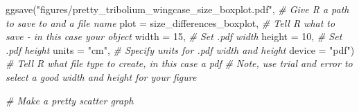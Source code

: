 \documentclass[
]{book}
\newenvironment{Shaded}{\begin{snugshade}}{\end{snugshade}}
\newcommand{\AttributeTok}[1]{\textcolor[rgb]{0.77,0.63,0.00}{#1}}
\newcommand{\CommentTok}[1]{\textcolor[rgb]{0.56,0.35,0.01}{\textit{#1}}}
\newcommand{\DecValTok}[1]{\textcolor[rgb]{0.00,0.00,0.81}{#1}}
\newcommand{\FunctionTok}[1]{\textcolor[rgb]{0.00,0.00,0.00}{#1}}
\newcommand{\NormalTok}[1]{#1}
\newcommand{\StringTok}[1]{\textcolor[rgb]{0.31,0.60,0.02}{#1}}
\begin{document}
\begin{Shaded}
\begin{Highlighting}[]
\FunctionTok{ggsave}\NormalTok{(}\StringTok{"figures/pretty\_tribolium\_wingcase\_size\_boxplot.pdf"}\NormalTok{, }\CommentTok{\# Give R a path to save to and a file name}
       \AttributeTok{plot =}\NormalTok{ size\_differences\_boxplot, }\CommentTok{\# Tell R what to save {-} in this case your object}
       \AttributeTok{width =} \DecValTok{15}\NormalTok{, }\CommentTok{\# Set .pdf width}
       \AttributeTok{height =} \DecValTok{10}\NormalTok{, }\CommentTok{\# Set .pdf height}
       \AttributeTok{units =} \StringTok{"cm"}\NormalTok{, }\CommentTok{\# Specify units for .pdf width and height}
       \AttributeTok{device =} \StringTok{"pdf"}\NormalTok{) }\CommentTok{\# Tell R what file type to create, in this case a pdf}
\CommentTok{\# Note, use trial and error to select a good width and height for your figure}

\CommentTok{\# Make a pretty scatter graph}


\end{Highlighting}
\end{Shaded}
\end{document}
